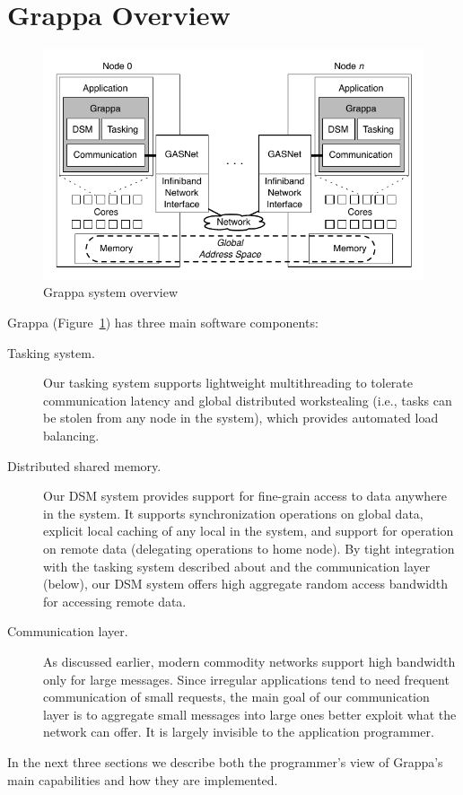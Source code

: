 \section{Grappa Overview}

\begin{figure}[t]
\begin{center}
  \includegraphics[width=0.95\columnwidth]{figs/system-overview}
\begin{minipage}{0.95\columnwidth}
  \caption{\label{fig:grappa} Grappa system overview}
\end{minipage}
\vspace{-3ex}
\end{center}
\end{figure}


Grappa (Figure~\ref{fig:grappa}) has three main software components:
\begin{description}

\item [Tasking system.] Our tasking system supports lightweight
multithreading to tolerate communication latency and global distributed
workstealing (i.e., tasks can be stolen from any node in the system), which
provides automated load balancing.

\item[Distributed shared memory.] Our DSM system provides support for
fine-grain access to data anywhere in the system. It supports synchronization
operations on global data, explicit local caching of any local in the system,
and support for operation on remote data (delegating operations to home node).
By tight integration with the tasking system described about and the
communication layer (below), our DSM system offers high aggregate random
access bandwidth for accessing remote data.

\item[Communication layer.] As discussed earlier, modern commodity networks
support high bandwidth only for large messages. Since irregular applications
tend to need frequent communication of small requests, the main goal of our
communication layer is to aggregate small messages into large ones better
exploit what the network can offer. It is largely invisible to the application
programmer.


\end{description}

In the next three sections we describe both the programmer's view of Grappa's main capabilities and how they are implemented.


